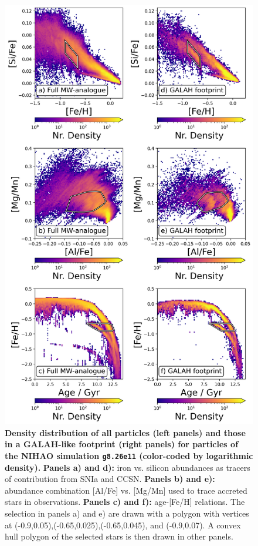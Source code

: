 \documentclass[fleqn,usenatbib]{mnras}
\begin{document}
\begin{figure}
	\includegraphics[width=\columnwidth]{figures/low_alpha_halo_convex_hull.png}
    \caption{
    \textbf{Density distribution of all particles (left panels) and those in a GALAH-like footprint (right panels) for particles of the NIHAO simulation \texttt{g8.26e11} (color-coded by logarithmic density).}
    \textbf{Panels a) and d):} iron vs. silicon abundances as tracers of contribution from SNIa and CCSN. \textbf{Panels b) and e):} abundance combination [Al/Fe] vs. [Mg/Mn] used to trace accreted stars in observations.
    \textbf{Panels c) and f):} age-[Fe/H] relations.  
    The selection in panels a) and e) are drawn with a polygon with vertices at (-0.9,0.05),(-0.65,0.025),(-0.65,0.045), and (-0.9,0.07). A convex hull polygon of the selected stars is then drawn in other panels.}
    \label{fig:low_alpha_halo}
\end{figure}
\end{document}
